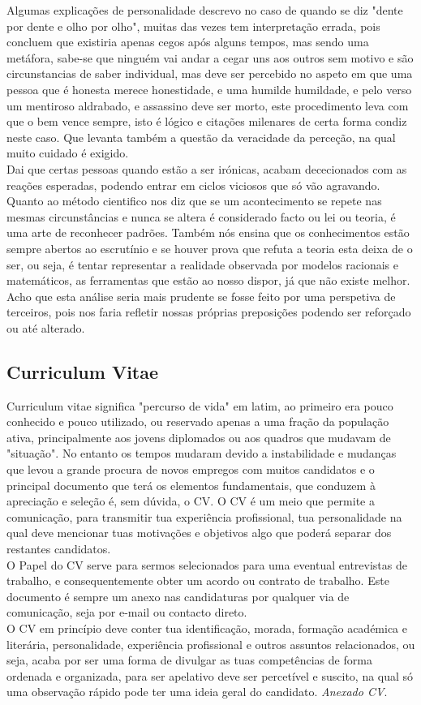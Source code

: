 \emptyline
Algumas explicações de personalidade descrevo no caso de quando se diz "dente por dente e olho por olho", muitas das vezes tem interpretação errada, pois concluem que existiria apenas cegos após alguns tempos, mas sendo uma metáfora, sabe-se que ninguém vai andar a cegar uns aos outros sem motivo e são circunstancias de saber individual, mas deve ser percebido no aspeto em que uma pessoa que é honesta merece honestidade, e uma humilde humildade, e pelo verso um mentiroso aldrabado, e assassino deve ser morto, este procedimento leva com que o bem vence sempre, isto é lógico e citações milenares de certa forma condiz neste caso. Que levanta também a questão da veracidade da perceção, na qual muito cuidado é exigido. \\
Dai que certas pessoas quando estão a ser irónicas, acabam dececionados com as reações esperadas, podendo entrar em ciclos viciosos que só vão agravando.
\emptyline
Quanto ao método cientifico nos diz que se um acontecimento se repete nas mesmas circunstâncias e nunca se altera é considerado facto ou lei ou teoria, é uma arte de reconhecer padrões. Também nós ensina que os conhecimentos estão sempre abertos ao escrutínio e se houver prova que refuta a teoria esta deixa de o ser, ou seja, é tentar representar a realidade observada por modelos racionais e matemáticos, as ferramentas que estão ao nosso dispor, já que não existe melhor.
\emptyline
Acho que esta análise seria mais prudente se fosse feito por uma perspetiva de terceiros, pois nos faria refletir nossas próprias preposições podendo ser reforçado ou até alterado.
\subsection{Curriculum Vitae}
\qquad Curriculum vitae significa "percurso de vida" \; em latim, ao primeiro era pouco conhecido e pouco utilizado, ou reservado apenas a uma fração da população ativa, principalmente aos jovens diplomados ou aos quadros que mudavam de "situação". No entanto os tempos mudaram devido a instabilidade e mudanças que levou a grande procura de novos empregos com muitos candidatos e o principal documento que terá os elementos fundamentais, que conduzem à apreciação e seleção é, sem dúvida, o CV.\cite{book-12}
O CV é um meio que permite a comunicação, para transmitir tua experiência profissional, tua personalidade na qual deve mencionar tuas motivações e objetivos algo que poderá separar dos restantes candidatos. \\
O Papel do CV serve para sermos selecionados para uma eventual entrevistas de trabalho, e consequentemente obter um acordo ou contrato de trabalho. Este documento é sempre um anexo nas candidaturas por qualquer via de comunicação, seja por e-mail ou contacto direto. \\
O CV em princípio deve conter tua identificação, morada, formação académica e literária, personalidade, experiência profissional e outros assuntos relacionados, ou seja, acaba por ser uma forma de divulgar as tuas competências de forma ordenada e organizada, para ser apelativo deve ser percetível e suscito, na qual só uma observação rápido pode ter uma ideia geral do candidato.
\emptyline
\textit{Anexado CV}.
